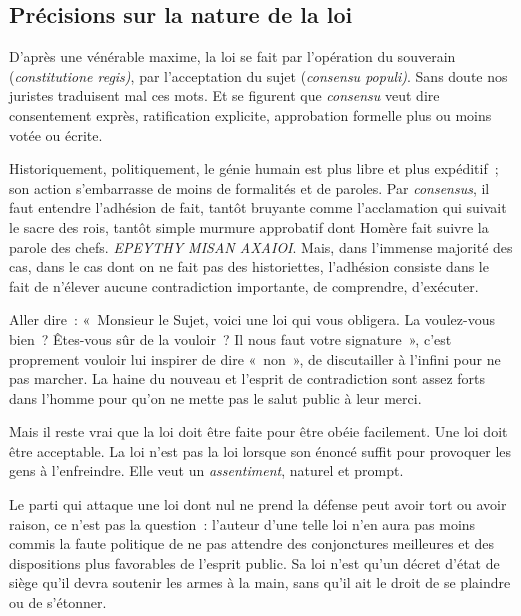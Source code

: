 \documentclass[french,twoside]{book} %
\newcommand{\astermono}{\medskip\centerline{\color{rubric}\large\selectfont{\syms ✻}}\medskip\par}%
\begin{document}
\astermono

\subsection[{Précisions sur la nature de la loi}]{Précisions sur la nature de la loi}
\noindent D’après une vénérable maxime, la loi se fait par l’opération du souverain (\emph{constitutione regis)}, par l’acceptation du sujet (\emph{consensu populi)}. Sans doute nos juristes traduisent mal ces mots. Et se figurent que \emph{consensu} veut dire consentement exprès, ratification explicite, approbation formelle plus ou moins votée ou écrite.\par
Historiquement, politiquement, le génie humain est plus libre et plus expéditif ; son action s’embarrasse de moins de formalités et de paroles. Par \emph{consensus}, il faut entendre l’adhésion de fait, tantôt bruyante comme l’acclamation qui suivait le sacre des rois, tantôt simple murmure approbatif dont Homère fait suivre la parole des chefs. \emph{EPEYTHY MISAN AXAIOI}. Mais, dans l’immense majorité des cas, dans le cas dont on ne fait pas des historiettes, l’adhésion consiste dans le fait de n’élever aucune contradiction importante, de comprendre, d’exécuter.\par
Aller dire : « Monsieur le Sujet, voici une loi qui vous obligera. La voulez-vous bien ? Êtes-vous sûr de la vouloir ? Il nous faut votre signature », c’est proprement vouloir lui inspirer de dire « non », de discutailler à l’infini pour ne pas marcher. La haine du nouveau et l’esprit de contradiction sont assez forts dans l’homme pour qu’on ne mette pas le salut public à leur merci.\par
Mais il reste vrai que la loi doit être faite pour être obéie facilement. Une loi doit être acceptable. La loi n’est pas la loi lorsque son énoncé suffit pour provoquer les gens à l’enfreindre. Elle veut un \emph{assentiment}, naturel et prompt.\par
Le parti qui attaque une loi dont nul ne prend la défense peut avoir tort ou avoir raison, ce n’est pas la question : l’auteur d’une telle loi n’en aura pas moins commis la faute politique de ne pas attendre des conjonctures meilleures et des dispositions plus favorables de l’esprit public. Sa loi n’est qu’un décret d’état de siège qu’il devra soutenir les armes à la main, sans qu’il ait le droit de se plaindre ou de s’étonner.\par

\astermono
\end{document}
